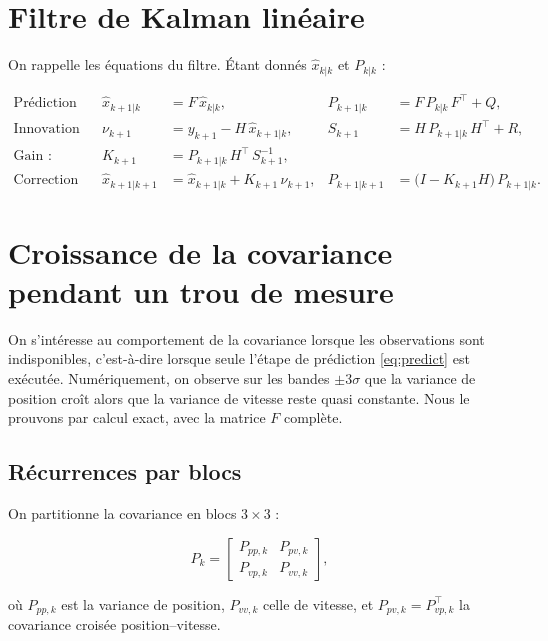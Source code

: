 \documentclass[11pt]{article}
\theoremstyle{remark}
\theoremstyle{definition}
\begin{document}
\section{Filtre de Kalman lin\'eaire}\label{sec:kalman}

On rappelle les \'equations du filtre. \'Etant donn\'es $\hat{x}_{k|k}$ et $P_{k|k}$ :

\begin{align}
\text{Pr\'ediction :}&&
\hat{x}_{k+1|k} &= F\, \hat{x}_{k|k}, &
P_{k+1|k} &= F\, P_{k|k}\, F^\top + Q, \label{eq:predict} \\
\text{Innovation :}&&
\nu_{k+1} &= y_{k+1} - H\, \hat{x}_{k+1|k}, &
S_{k+1} &= H\, P_{k+1|k}\, H^\top + R, \label{eq:innov} \\
\text{Gain :}&&
K_{k+1} &= P_{k+1|k}\, H^\top\, S_{k+1}^{-1}, \label{eq:gain} \\
\text{Correction :}&&
\hat{x}_{k+1|k+1} &= \hat{x}_{k+1|k} + K_{k+1}\,\nu_{k+1}, &
P_{k+1|k+1} &= \bigl(I - K_{k+1} H\bigr)\, P_{k+1|k}. \label{eq:corr}
\end{align}

\section{Croissance de la covariance pendant un trou de mesure}\label{sec:trou}

On s'int\'eresse au comportement de la covariance lorsque les observations sont indisponibles,
c'est-\`a-dire lorsque seule l'\'etape de pr\'ediction \eqref{eq:predict} est ex\'ecut\'ee.
Num\'eriquement, on observe sur les bandes $\pm 3\sigma$ que la variance de position cro\^it alors que
la variance de vitesse reste quasi constante. Nous le prouvons par calcul exact, avec la matrice $F$
compl\`ete.

\subsection{R\'ecurrences par blocs}

On partitionne la covariance en blocs $3\times 3$ :

\begin{equation}
P_k =
\begin{bmatrix}
P_{pp,k} & P_{pv,k} \\[2pt]
P_{vp,k} & P_{vv,k}
\end{bmatrix},
\end{equation}

o\`u $P_{pp,k}$ est la variance de position, $P_{vv,k}$ celle de vitesse, et
$P_{pv,k} = P_{vp,k}^\top$ la covariance crois\'ee position--vitesse.
\end{document}
